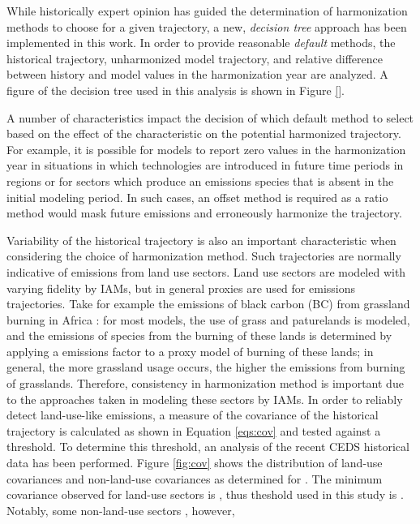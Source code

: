 While historically expert opinion has guided the determination of harmonization
methods to choose for a given trajectory, a new, \textit{decision tree} approach
has been implemented in this work. In order to provide reasonable
\textit{default} methods, the historical trajectory, unharmonized model
trajectory, and relative difference between history and model values in the
harmonization year are analyzed. A figure of the decision tree used in this
analysis is shown in Figure \ref{}. 


A number of characteristics impact the decision of which default method to
select based on the effect of the characteristic on the potential harmonized
trajectory. For example, it is possible for models to report zero values in the
harmonization year in situations in which technologies are introduced in future
time periods in regions or for sectors which produce an emissions species that
is absent in the initial modeling period. In such cases, an offset method is
required as a ratio method would mask future emissions and erroneously harmonize
the trajectory. 

Variability of the historical trajectory is also an important characteristic
when considering the choice of harmonization method. Such trajectories are
normally indicative of emissions from land use sectors. Land use sectors are
modeled with varying fidelity by IAMs, but in general proxies are used for
emissions trajectories. Take for example the emissions of black carbon (BC) from
grassland burning in Africa : for most
models, the use of grass and paturelands is modeled, and the emissions of
species from the burning of these lands is determined by applying a emissions
factor to a proxy model of burning of these lands; in general, the more
grassland usage occurs, the higher the emissions from burning of
grasslands. Therefore, consistency in harmonization method is important due to
the approaches taken in modeling these sectors by IAMs. In order to reliably
detect land-use-like emissions, a measure of the covariance of the historical
trajectory is calculated as shown in Equation \ref{eqs:cov} and tested against a
threshold. To determine this threshold, an analysis of the recent CEDS
 historical data has been performed. Figure \ref{fig:cov}
shows the distribution of land-use covariances and non-land-use covariances as
determined for . The minimum covariance
observed for land-use sectors is , thus theshold used in this study
is . Notably, some non-land-use sectors , however,

